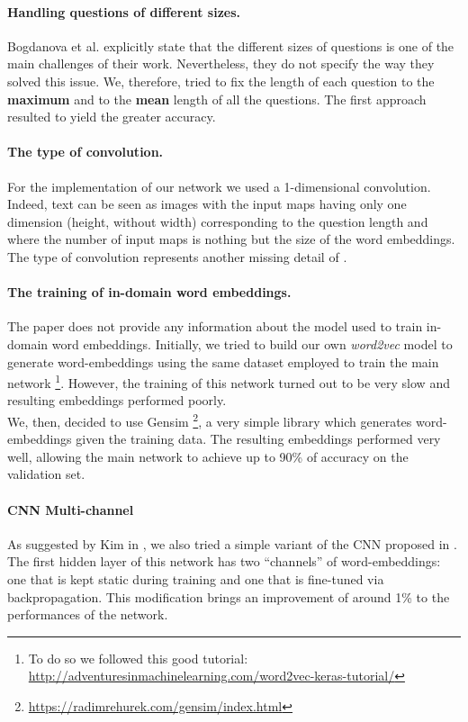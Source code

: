 \documentclass[10pt,twocolumn,letterpaper]{article}
\begin{document}
    \paragraph{Handling questions of different sizes.}
    Bogdanova et al. explicitly state that the different sizes of questions is one of the main challenges of their work. Nevertheless, they do not specify the way they solved this issue. We, therefore, tried to fix the length of each question to the \textbf{maximum} and to the \textbf{mean} length of all the questions. The first approach resulted to yield the greater accuracy.
    \paragraph{The type of convolution.}
    For the implementation of our network we used a 1-dimensional convolution. Indeed, text can be seen as images with the input maps having only one dimension (height, without width) corresponding to the question length and where the number of input maps is nothing but the size of the word embeddings. The type of convolution represents another missing detail of \cite{bogdanova2015detecting}.    
    \paragraph{The training of in-domain word embeddings.}
    The paper does not provide any information about the model used to train in-domain word embeddings. Initially, we tried to build our own \emph{word2vec} model \cite{mikolov2013distributed} to generate word-embeddings using the same dataset employed to train the main network \footnote{To do so we followed this good tutorial: \url{http://adventuresinmachinelearning.com/word2vec-keras-tutorial/}}. However, the training of this network turned out to be very slow and resulting embeddings performed poorly. \\
    We, then, decided to use Gensim \footnote{\url{https://radimrehurek.com/gensim/index.html}}, a very simple library which generates word-embeddings given the training data. The resulting embeddings performed very well, allowing the main network to achieve up to 90\% of accuracy on the validation set.
    	\paragraph{CNN Multi-channel}
    	As suggested by Kim in \cite{kim2014convolutional}, we also tried a simple variant of the CNN proposed in \cite{bogdanova2015detecting}. The first hidden layer of this network has two ``channels'' of word-embeddings: one that is kept static during training and one that is fine-tuned via backpropagation. This modification brings an improvement of around 1\% to the performances of the network.  
\end{document}
